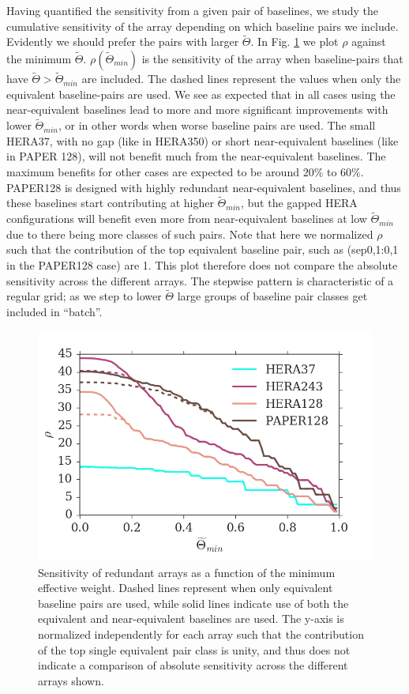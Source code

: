 \documentclass[twocolumn,apj,numberedappendix]{emulateapj}
\renewcommand\[{\begin{equation}}
\renewcommand\]{\end{equation}}
\begin{document}
Having quantified the sensitivity from a given pair of baselines, we study the cumulative sensitivity of the array depending on which baseline pairs we include. Evidently we should prefer the pairs with larger $\widetilde{\Theta}$. In Fig. \ref{fig:osens} we plot $\rho$ against the minimum $\widetilde{\Theta}$. $\rho(\widetilde{\Theta}_{min})$ is the sensitivity of the array when baseline-pairs that have $\widetilde{\Theta}>\widetilde{\Theta}_{min}$ are included. The dashed lines represent the values when only the equivalent baseline-pairs are used.  We see as expected that in all cases using the near-equivalent baselines lead to more and more significant improvements with lower $\widetilde{\Theta}_{min}$, or in other words when worse baseline pairs are used. The small HERA37, with no gap (like in HERA350) or short near-equivalent baselines (like in PAPER 128), will not benefit much from the near-equivalent baselines. The maximum benefits for other cases are expected to be around $20\%$ to $60\%$. PAPER128 is designed with highly redundant near-equivalent baselines, and thus  these baselines start contributing at higher $\widetilde{\Theta}_{min}$, but the gapped HERA configurations will benefit even more from near-equivalent baselines at low $\widetilde{\Theta}_{min}$ due to there being more classes of such pairs. Note that here we normalized $\rho$ such that the contribution of the top equivalent baseline pair, such as (sep0,1:0,1 in the PAPER128 case) are 1. This plot therefore does not compare the absolute sensitivity across the different arrays. The stepwise pattern is characteristic of a regular grid; as we step to lower $\widetilde{\Theta}$ large groups of baseline pair classes get included in ``batch''. 
\begin{figure}[H]
\includegraphics[width=\linewidth]{osens}
\caption{Sensitivity of redundant arrays as a function of the minimum effective weight. Dashed lines represent when only equivalent baseline pairs are used, while solid lines indicate use of both the equivalent and near-equivalent baselines are used. The y-axis is normalized independently for each array such that the contribution of the top single equivalent pair class is unity, and thus does not indicate a comparison of absolute sensitivity across the different arrays shown.  }
\label{fig:osens}
\end{figure}
\end{document}

